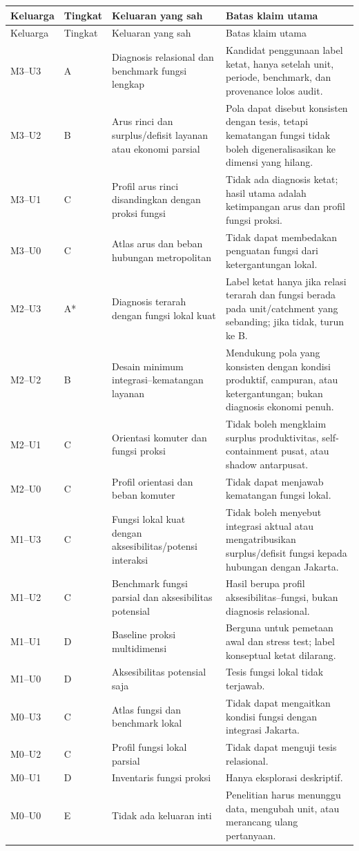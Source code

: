 \documentclass[10pt]{article}
\begin{document}
\begin{longtable}{@{}P{0.10\textwidth}P{0.13\textwidth}P{0.25\textwidth}P{0.44\textwidth}@{}}
\toprule
Keluarga & Tingkat & Keluaran yang sah & Batas klaim utama \\
\midrule
\endfirsthead
\toprule
Keluarga & Tingkat & Keluaran yang sah & Batas klaim utama \\
\midrule
\endhead
M3--U3 & A & Diagnosis relasional dan benchmark fungsi lengkap & Kandidat penggunaan label ketat, hanya setelah unit, periode, benchmark, dan provenance lolos audit. \\
M3--U2 & B & Arus rinci dan surplus/defisit layanan atau ekonomi parsial & Pola dapat disebut konsisten dengan tesis, tetapi kematangan fungsi tidak boleh digeneralisasikan ke dimensi yang hilang. \\
M3--U1 & C & Profil arus rinci disandingkan dengan proksi fungsi & Tidak ada diagnosis ketat; hasil utama adalah ketimpangan arus dan profil fungsi proksi. \\
M3--U0 & C & Atlas arus dan beban hubungan metropolitan & Tidak dapat membedakan penguatan fungsi dari ketergantungan lokal. \\
M2--U3 & A* & Diagnosis terarah dengan fungsi lokal kuat & Label ketat hanya jika relasi terarah dan fungsi berada pada unit/catchment yang sebanding; jika tidak, turun ke B. \\
M2--U2 & B & Desain minimum integrasi--kematangan layanan & Mendukung pola yang konsisten dengan kondisi produktif, campuran, atau ketergantungan; bukan diagnosis ekonomi penuh. \\
M2--U1 & C & Orientasi komuter dan fungsi proksi & Tidak boleh mengklaim surplus produktivitas, self-containment pusat, atau shadow antarpusat. \\
M2--U0 & C & Profil orientasi dan beban komuter & Tidak dapat menjawab kematangan fungsi lokal. \\
M1--U3 & C & Fungsi lokal kuat dengan aksesibilitas/potensi interaksi & Tidak boleh menyebut integrasi aktual atau mengatribusikan surplus/defisit fungsi kepada hubungan dengan Jakarta. \\
M1--U2 & C & Benchmark fungsi parsial dan aksesibilitas potensial & Hasil berupa profil aksesibilitas--fungsi, bukan diagnosis relasional. \\
M1--U1 & D & Baseline proksi multidimensi & Berguna untuk pemetaan awal dan stress test; label konseptual ketat dilarang. \\
M1--U0 & D & Aksesibilitas potensial saja & Tesis fungsi lokal tidak terjawab. \\
M0--U3 & C & Atlas fungsi dan benchmark lokal & Tidak dapat mengaitkan kondisi fungsi dengan integrasi Jakarta. \\
M0--U2 & C & Profil fungsi lokal parsial & Tidak dapat menguji tesis relasional. \\
M0--U1 & D & Inventaris fungsi proksi & Hanya eksplorasi deskriptif. \\
M0--U0 & E & Tidak ada keluaran inti & Penelitian harus menunggu data, mengubah unit, atau merancang ulang pertanyaan. \\
\bottomrule
\end{longtable}
\end{document}
